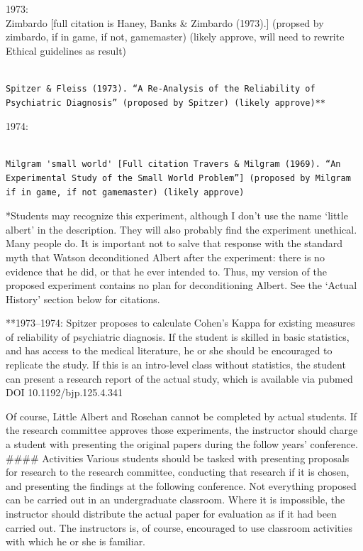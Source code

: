 1973:\\
 Zimbardo [full citation is Haney, Banks \& Zimbardo (1973).] (propsed by zimbardo, if in game, if not, gamemaster) (likely approve, will need to rewrite Ethical guidelines as result) 

\begin{adjustwidth}{2.5em}{2.5em}
\begin{verbatim}

Spitzer & Fleiss (1973). “A Re-Analysis of the Reliability of Psychiatric Diagnosis” (proposed by Spitzer) (likely approve)**

\end{verbatim}
\end{adjustwidth}

1974: 

\begin{adjustwidth}{2.5em}{2.5em}
\begin{verbatim}

Milgram 'small world' [Full citation Travers & Milgram (1969). “An Experimental Study of the Small World Problem”] (proposed by Milgram if in game, if not gamemaster) (likely approve)

\end{verbatim}
\end{adjustwidth}

*Students may recognize this experiment, although I don't use the name `little albert' in the description. They will also probably find the experiment unethical. Many people do. It is important not to salve that response with the standard myth that Watson deconditioned Albert after the experiment: there is no evidence that he did, or that he ever intended to. Thus, my version of the proposed experiment contains no plan for deconditioning Albert. See the `Actual History' section below for citations.

**1973--1974: Spitzer proposes to calculate Cohen's Kappa for existing measures of reliability of psychiatric diagnosis. If the student is skilled in basic statistics, and has access to the medical literature, he or she should be encouraged to replicate the study. If this is an intro-level class without statistics, the student can present a research report of the actual study, which is available via pubmed DOI 10.1192\slash bjp.125.4.341

Of course, Little Albert and Rosehan cannot be completed by actual students. If the research committee approves those experiments, the instructor should charge a student with presenting the original papers during the follow years' conference.
 \#\#\#\# Activities
Various students should be tasked with presenting proposals for research to the research committee, conducting that research if it is chosen, and presenting the findings at the following conference. Not everything proposed can be carried out in an undergraduate classroom. Where it is impossible, the instructor should distribute the actual paper for evaluation as if it had been carried out. The instructors is, of course, encouraged to use classroom activities with which he or she is familiar. 

